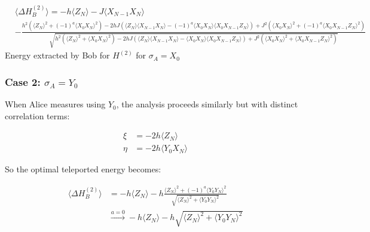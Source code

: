 \begin{widetext}
    \centering
    {\scriptsize
    \begin{equation}
    \label{eq:delta_HB2}
    \begin{aligned}
      &\langle \Delta H_B^{(2)} \rangle = -h\langle Z_N \rangle - J\langle X_{N-1} X_N \rangle \\
            & - \frac{
                h^2\left(\langle Z_N \rangle^2 + (-1)^a\langle X_0X_N \rangle^2\right)
                - 2hJ\left(\langle Z_N \rangle\langle X_{N-1}X_N \rangle - (-1)^a\langle X_0X_N \rangle\langle X_0X_{N-1}Z_N \rangle\right)
                + J^2\left(\langle X_0X_N \rangle^2 + (-1)^a\langle X_0X_{N-1}Z_N \rangle^2\right)
            }{
            \sqrt{
                h^2\left(\langle Z_N \rangle^2 + \langle X_0X_N \rangle^2\right)
                - 2hJ\left(\langle Z_N \rangle\langle X_{N-1}X_N \rangle - \langle X_0X_N \rangle\langle X_0X_{N-1}Z_N \rangle\right)
                + J^2\left(\langle X_0X_N \rangle^2 + \langle X_0X_{N-1}Z_N \rangle^2\right)
            }}
    \end{aligned}
    \end{equation}
    }
    Energy extracted by Bob for $H^{(2)}$ for $\sigma_A = X_0$
\end{widetext}

\subsubsection*{Case 2: \texorpdfstring{\( \sigma_A = Y_0 \)}{sigmaAY0}}

When Alice measures using \( Y_0 \), the analysis proceeds similarly but with distinct correlation terms:

\begin{align}
\xi &= -2h \langle Z_N \rangle \\
\eta &= -2h \langle Y_0 X_N \rangle
\end{align}

So the optimal teleported energy becomes:

\begin{equation}
\label{eq:delta_HB2_Y}
    \begin{aligned}
        \langle \Delta H_B^{(2)} \rangle &{}= -h\langle Z_N \rangle - h\frac{\langle Z_N \rangle^2 + (-1)^a\langle Y_0Y_N \rangle^2}{\sqrt{\langle Z_N \rangle^2 + \langle Y_0Y_N \rangle^2}} \nonumber\\
        &\xrightarrow[]{a=0} -h\langle Z_N \rangle - h\sqrt{\langle Z_N \rangle^2 + \langle Y_0Y_N \rangle^2}
    \end{aligned}    
\end{equation}

